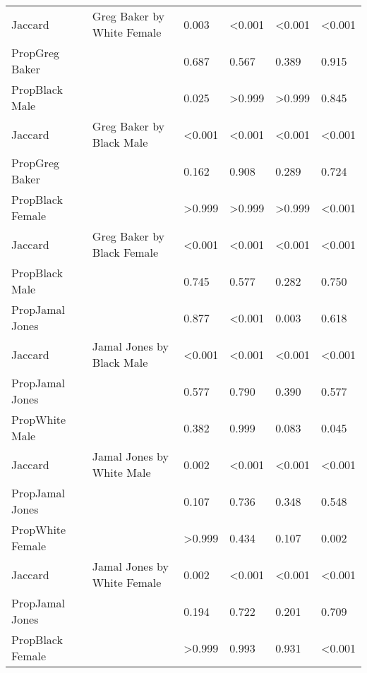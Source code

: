 \begin{tabular}{llllll}
Jaccard & \multirow{-3}{*}{\raggedright\arraybackslash Greg Baker by White Female} & 0.003 & <0.001 & <0.001 & <0.001\\
\cmidrule{1-6}
PropGreg Baker &  & 0.687 & 0.567 & 0.389 & 0.915\\

PropBlack Male &  & 0.025 & >0.999 & >0.999 & 0.845\\

Jaccard & \multirow{-3}{*}{\raggedright\arraybackslash Greg Baker by Black Male} & <0.001 & <0.001 & <0.001 & <0.001\\
\cmidrule{1-6}
PropGreg Baker &  & 0.162 & 0.908 & 0.289 & 0.724\\

PropBlack Female &  & >0.999 & >0.999 & >0.999 & <0.001\\

Jaccard & \multirow{-3}{*}{\raggedright\arraybackslash Greg Baker by Black Female} & <0.001 & <0.001 & <0.001 & <0.001\\
\cmidrule{1-6}
PropBlack Male &  & 0.745 & 0.577 & 0.282 & 0.750\\

PropJamal Jones &  & 0.877 & <0.001 & 0.003 & 0.618\\

Jaccard & \multirow{-3}{*}{\raggedright\arraybackslash Jamal Jones by Black Male} & <0.001 & <0.001 & <0.001 & <0.001\\
\cmidrule{1-6}
PropJamal Jones &  & 0.577 & 0.790 & 0.390 & 0.577\\

PropWhite Male &  & 0.382 & 0.999 & 0.083 & 0.045\\

Jaccard & \multirow{-3}{*}{\raggedright\arraybackslash Jamal Jones by White Male} & 0.002 & <0.001 & <0.001 & <0.001\\
\cmidrule{1-6}
PropJamal Jones &  & 0.107 & 0.736 & 0.348 & 0.548\\

PropWhite Female &  & >0.999 & 0.434 & 0.107 & 0.002\\

Jaccard & \multirow{-3}{*}{\raggedright\arraybackslash Jamal Jones by White Female} & 0.002 & <0.001 & <0.001 & <0.001\\
\cmidrule{1-6}
PropJamal Jones &  & 0.194 & 0.722 & 0.201 & 0.709\\

PropBlack Female &  & >0.999 & 0.993 & 0.931 & <0.001\\


\end{tabular}
